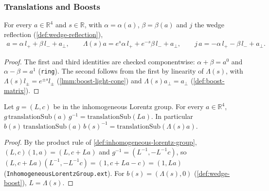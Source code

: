 \subsubsection{Translations and Boosts}

\begin{lemma}
    \label{lmm:light-cone-decomposition}
    \leanok
    For every $a \in \mathbb{R}^4$ and $s \in \mathbb{R}$, with $\alpha = \alpha(a)$, $\beta = \beta(a)$ and $j$ the wedge reflection (\ref{def:wedge-reflection}),
    \begin{align}
        a = \alpha\,l_+ + \beta\,l_- + a_\perp, \qquad \Lambda(s)a = e^{s}\alpha\,l_+ + e^{-s}\beta\,l_- + a_\perp, \qquad j\,a = -\alpha\,l_+ - \beta\,l_- + a_\perp.
    \end{align}
\end{lemma}
\begin{proof}
    \leanok
    The first and third identities are checked componentwise: $\alpha + \beta = a^0$ and $\alpha - \beta = a^1$ (\texttt{ring}). The second follows from the first by linearity of $\Lambda(s)$, with $\Lambda(s)l_\pm = e^{\pm s}l_\pm$ (\ref{lmm:boost-light-cone}) and $\Lambda(s)a_\perp = a_\perp$ (\ref{def:boost-matrix}).
\end{proof}

\begin{lemma}
    \label{lmm:poincare-conjugates-translation}
    \leanok
    Let $g = (L, c)$ be in the inhomogeneous Lorentz group. For every $a \in \mathbb{R}^4$, $g\,\mathrm{translationSub}(a)\,g^{-1} = \mathrm{translationSub}(La)$. In particular $b(s)\,\mathrm{translationSub}(a)\,b(s)^{-1} = \mathrm{translationSub}(\Lambda(s)a)$.
\end{lemma}
\begin{proof}
    \leanok
    By the product rule of \ref{def:inhomogeneous-lorentz-group}, $(L, c)(1, a) = (L, c + La)$ and $g^{-1} = (L^{-1}, -L^{-1}c)$, so $(L, c + La)(L^{-1}, -L^{-1}c) = (1, c + La - c) = (1, La)$ (\texttt{InhomogeneousLorentzGroup.ext}). For $b(s) = (\Lambda(s), 0)$ (\ref{def:wedge-boost}), $L = \Lambda(s)$.
\end{proof}

